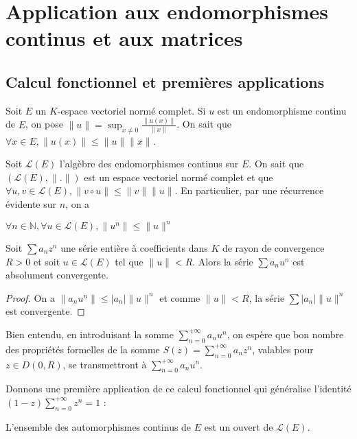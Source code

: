 \section{Application aux endomorphismes continus et aux matrices}

\subsection{Calcul fonctionnel et premières applications}

Soit $E$ un $K$-espace vectoriel normé complet. Si $u$ est un endomorphisme continu de $E$, on pose $\|u\| = \sup_{x \neq 0} \frac{\|u(x)\|}{\|x\|}$. On sait que $\forall x \in E, \|u(x)\| \leq \|u\| \|x\|$.

Soit $\mathcal{L}(E)$ l'algèbre des endomorphismes continus sur $E$. On sait que $(\mathcal{L}(E),\|.\|)$ est un espace vectoriel normé complet et que $\forall u,v \in \mathcal{L}(E), \|v \circ u\| \leq \|v\| \|u\|$.
En particulier, par une récurrence évidente sur $n$, on a

$\forall n \in \mathbb{N}, \forall u \in \mathcal{L}(E), \|u^n\| \leq \|u\|^n$

\begin{prop}
Soit $\sum a_n z^n$ une série entière à coefficients dans $K$ de rayon de convergence $R > 0$ et soit $u \in \mathcal{L}(E)$ tel que $\|u\| < R$. Alors la série $\sum a_n u^n$ est absolument convergente.
\end{prop}

\begin{proof}
On a $\|a_n u^n\| \leq |a_n| \|u\|^n$ et comme $\|u\| < R$, la série $\sum |a_n| \|u\|^n$ est convergente.
\end{proof}

\begin{rem}
Bien entendu, en introduisant la somme $\sum_{n=0}^{+\infty} a_n u^n$, on espère que bon nombre des propriétés formelles de la somme $S(z) = \sum_{n=0}^{+\infty} a_n z^n$, valables pour $z \in D(0,R)$, se transmettront à $\sum_{n=0}^{+\infty} a_n u^n$.
\end{rem}

Donnons une première application de ce calcul fonctionnel qui généralise l'identité $(1-z)\sum_{n=0}^{+\infty} z^n = 1$ :

\begin{prop}
L'ensemble des automorphismes continus de $E$ est un ouvert de $\mathcal{L}(E)$.
\end{prop}


